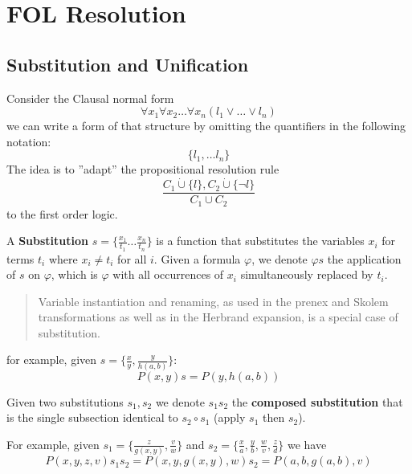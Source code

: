 \documentclass[10pt, letterpaper]{report}
\begin{document}
\section{FOL Resolution}
\subsection{Substitution and Unification}
Consider the Clausal normal form\begin{equation}
    \forall x_1\forall x_2\dots \forall x_n(l_1\lor \dots \lor l_n)
\end{equation}
we can write a form of that structure by omitting the quantifiers in the following notation:\begin{equation}
    \{l_1,\dots l_n\}
\end{equation}
The idea is to ''adapt'' the propositional resolution rule 
\begin{equation}
    \frac{C_1\dot\cup\{l\},C_2\dot\cup\{\lnot l\}}{C_1\cup C_2}
\end{equation}
to the first order logic.
\begin{definition}[Substitution]
    A \textbf{Substitution} $s=\{\tfrac{x_1}{t_1}\dots \tfrac{x_n}{t_n}\}$ is a function that substitutes the variables $x_i$ for terms $t_i$ where $x_i\ne t_i$ for all $i$. Given a formula $\varphi$, we denote $\varphi s$ the application of $s$ on $\varphi$, which is $\varphi$ with all occurrences of $x_i$ simultaneously replaced by $t_i$.
\end{definition}
\begin{quotation}
    Variable instantiation and renaming, as used in the prenex and Skolem
 transformations as well as in the Herbrand expansion, is a special case of
 substitution.
\end{quotation}
for example, given $s=\{\tfrac{x}{y},\tfrac{y}{h(a,b)}\}$:\begin{equation}
    P(x,y)s=P(y,h(a,b))
\end{equation}
\begin{definition}[Composition]
    Given two substitutions $s_1,s_2$ we denote $s_1s_2$ the \textbf{composed substitution} that is the single subsection identical to $s_2\circ s_1$ (apply $s_1$ then $s_2$).
\end{definition}
For example, given $s_1=\{\tfrac{z}{g(x,y)},\tfrac{v}{w}\}$ and $s_2=\{\tfrac{x}{a},\tfrac{y}{b},\tfrac{w}{v},\tfrac{z}{d}\}$ we have\begin{equation}
    P(x,y,z,v)s_1s_2=P(x,y,g(x,y),w)s_2=P(a,b,g(a,b),v)
\end{equation}
\end{document}
